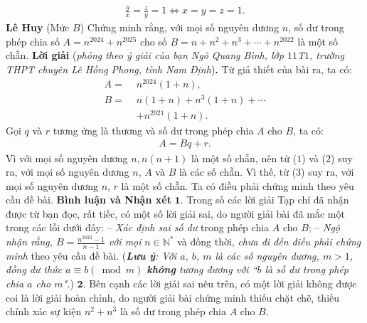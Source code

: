 \begin{multicols}{2}
	\begin{align*}
		\frac{y}{x} = \frac{z}{y} = 1 \Leftrightarrow  x = y = z = 1.
	\end{align*}
	\hfill	\textbf{\color{thachthuctoanhoc}Lê Huy}
	\vskip 0.1cm
	{}
	(Mức $B$) Chứng minh rằng, với mọi số nguyên dương $n$, số dư trong phép chia số $A=n^{2024}+n^{2025}$  cho số $B=n+n^2+n^3+\cdots+n^{2022}$ là một số chẵn. 
	\vskip 0.05cm
	\textbf{\color{thachthuctoanhoc}Lời giải} (\textit{phỏng theo ý giải của bạn Ngô Quang Bình, lớp $11$T$1$, trường THPT chuyên Lê Hồng Phong, tỉnh Nam Định})\textbf{\color{thachthuctoanhoc}.}
	\vskip 0.05cm
	Từ giả thiết của bài ra, ta có:
	\begin{align*}
		A = \,\,&{n^{2024}}\left( {1 + n} \right), \tag{$1$}\\
		B = \,\,&n\left( {1 + n} \right) + {n^3}\left( {1 + n} \right) +  \cdots  \\
		&+ {n^{2021}}\left( {1 + n} \right). \tag{$2$}
	\end{align*}
	Gọi $q$ và $r$ tương ứng là thương và số dư trong phép chia $A$ cho $B$, ta có:
	\begin{align*}
		A = Bq + r. \tag{$3$}
	\end{align*}
	Vì với mọi số nguyên dương $n, n(n + 1)$ là một số chẵn, nên từ ($1$) và ($2$) suy ra, với mọi số nguyên dương $n$, $A$ và $B$ là các số chẵn. Vì thế, từ ($3$) suy ra, với mọi số nguyên dương $n$, $r$ là một số chẵn.
	\vskip 0.05cm
	Ta có điều phải chứng minh theo yêu cầu đề bài.
	\vskip 0.05cm
	\textbf{\color{thachthuctoanhoc}Bình luận và Nhận xét}
	\vskip 0.05cm
	$\pmb{1.}$ Trong số các lời giải Tạp chí đã nhận được từ bạn đọc, rất tiếc, có một số lời giải sai, do người giải bài đã mắc một trong các lỗi dưới đây:
	\vskip 0.05cm
	-- \textit{Xác định sai số dư} trong phép chia $A$ cho $B$;
	\vskip 0.05cm
	--\textit{ Ngộ nhận rằng, $B = \frac{{{n^{2023}} - 1}}{{n - 1}}$  với mọi} $n \in \mathbb{N^*}$  và đồng thời, \textit{chưa đi đến điều phải chứng minh} theo yêu cầu đề bài.
	\vskip 0.05cm
	(\textit{\textbf{\color{thachthuctoanhoc}Lưu ý}: Với $a$, $b$, $m$ là các số nguyên dương, $m > 1$, đồng dư thức $a \equiv b\left( {\bmod m} \right)$  \textbf{\color{thachthuctoanhoc}không} tương đương với ``$b$ là số dư trong phép chia $a$ cho $m$".})
	\vskip 0.05cm
	$\pmb{2.}$ Bên cạnh các lời giải sai nêu trên, có một lời giải không được coi là lời giải hoàn chỉnh, do người giải bài chứng minh thiếu chặt chẽ, thiếu chính xác sự kiện $n^2 + n^3$  là số dư trong phép chia $A$ cho $B$.
	\vskip 0.05cm

\end{multicols}

